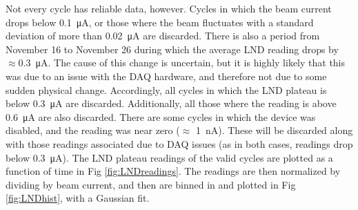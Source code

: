\documentclass[10pt,letterpaper]{article}
\begin{document}
Not every cycle has reliable data, however. Cycles in which the beam current drops below \SI{0.1}{\micro\ampere}, or those where the beam fluctuates with a standard deviation of more than \SI{0.02}{\micro\ampere} are discarded. There is also a period from November 16 to November 26 during which the average LND reading drops by $\approx$\SI{0.3}{\micro\ampere}. The cause of this change is uncertain, but it is highly likely that this was due to an issue with the DAQ hardware, and therefore not due to some sudden physical change. Accordingly, all cycles in which the LND plateau is below \SI{0.3}{\micro\ampere} are discarded. Additionally, all those where the reading is above \SI{0.6}{\micro\ampere} are also discarded. There are some cycles in which the device was disabled, and the reading was near zero ($\approx$ \SI{1}{\nano\ampere}). These will be discarded along with those readings associated due to DAQ issues (as in both cases, readings drop below \SI{0.3}{\micro\ampere}). The LND plateau readings of the valid cycles are plotted as a function of time in Fig \ref{fig:LNDreadings}. The readings are then normalized by dividing by beam current, and then are binned in and plotted in Fig \ref{fig:LNDhist}, with a Gaussian fit.
\end{document}
